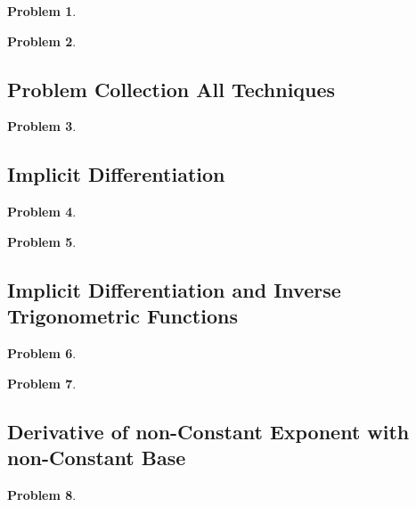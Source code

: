 \documentclass{article}
\newtheorem{problem}{Problem}
\begin{document}
\begin{problem}

\end{problem}
\begin{problem}

\end{problem}
\subsection{Problem Collection All Techniques}
\begin{problem}

\end{problem}


\subsection{Implicit Differentiation}\label{secMPSImplicitDifferentiation}
\begin{problem}

\end{problem}
\begin{problem}

\end{problem}


\subsection{Implicit Differentiation and Inverse Trigonometric Functions}
\begin{problem}

\end{problem}
\begin{problem}

\end{problem}

\subsection{Derivative of non-Constant Exponent with non-Constant Base}\label{secMPSDerivativeNonConstExponent}
\begin{problem}

\end{problem}

\end{document}
